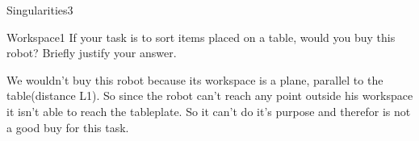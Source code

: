 \begin{questions}
\begin{question}{Singularities}{3}
\begin{answer}\end{answer}

\end{question}


\begin{question}{Workspace}{1}
If your task is to sort items placed on a table, would you buy this robot? Briefly justify your answer.

\begin{answer}
We wouldn't buy this robot because its workspace is a plane, parallel to the table(distance L1). So since the robot can't reach any point outside his workspace it isn't able to reach the tableplate. So it can't do it's purpose and therefor is not a good buy for this task.
\end{answer}

\end{question}

\end{questions}
